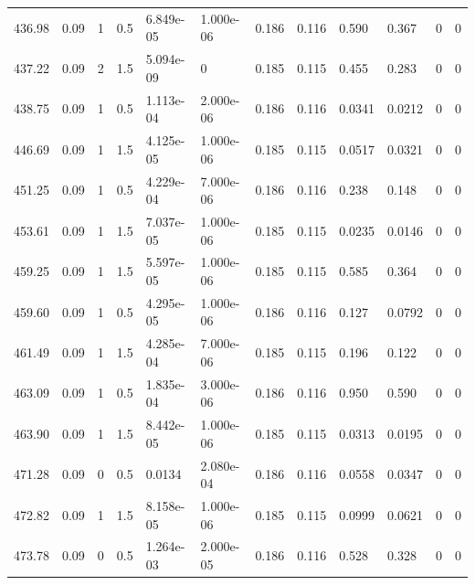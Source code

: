 \documentclass[preview]{standalone}
\begin{document}
{{{\begin{tabular}{L{1.2cm}C{1.2cm} C{0.3cm}C{0.5cm} C{1.4cm}C{1.4cm} C{1.4cm}C{1.4cm} C{1.6cm}C{1.6cm} C{1.6cm}C{1.6cm}}
  436.98  &  0.09  & 1     & 0.5 &  6.849e-05  & 1.000e-06  &  0.186&   0.116& 0.590 & 0.367   &  0 & 0  \\ 
  437.22  &  0.09  & 2     & 1.5 &  5.094e-09  & 0  &  0.185&   0.115& 0.455 & 0.283   &  0 & 0  \\ 
  438.75  &  0.09  & 1     & 0.5 &  1.113e-04  & 2.000e-06  &  0.186&   0.116& 0.0341 & 0.0212   &  0 & 0  \\ 
  446.69  &  0.09  & 1     & 1.5 &  4.125e-05  & 1.000e-06  &  0.185&   0.115& 0.0517 & 0.0321   &  0 & 0  \\ 
  451.25  &  0.09  & 1     & 0.5 &  4.229e-04  & 7.000e-06  &  0.186&   0.116& 0.238 & 0.148   &  0 & 0  \\ 
  453.61  &  0.09  & 1     & 1.5 &  7.037e-05  & 1.000e-06  &  0.185&   0.115& 0.0235 & 0.0146   &  0 & 0  \\ 
  459.25  &  0.09  & 1     & 1.5 &  5.597e-05  & 1.000e-06  &  0.185&   0.115& 0.585 & 0.364   &  0 & 0  \\ 
  459.60  &  0.09  & 1     & 0.5 &  4.295e-05  & 1.000e-06  &  0.186&   0.116& 0.127 & 0.0792   &  0 & 0  \\ 
  461.49  &  0.09  & 1     & 1.5 &  4.285e-04  & 7.000e-06  &  0.185&   0.115& 0.196 & 0.122   &  0 & 0  \\ 
  463.09  &  0.09  & 1     & 0.5 &  1.835e-04  & 3.000e-06  &  0.186&   0.116& 0.950 & 0.590   &  0 & 0  \\ 
  463.90  &  0.09  & 1     & 1.5 &  8.442e-05  & 1.000e-06  &  0.185&   0.115& 0.0313 & 0.0195   &  0 & 0  \\ 
  471.28  &  0.09  & 0     & 0.5 &  0.0134  & 2.080e-04  &  0.186&   0.116& 0.0558 & 0.0347   &  0 & 0  \\ 
  472.82  &  0.09  & 1     & 1.5 &  8.158e-05  & 1.000e-06  &  0.185&   0.115& 0.0999 & 0.0621   &  0 & 0  \\ 
  473.78  &  0.09  & 0     & 0.5 &  1.264e-03  & 2.000e-05  &  0.186&   0.116& 0.528 & 0.328   &  0 & 0  \\ 
\hline 
\end{tabular} 

}}}
\end{document}
